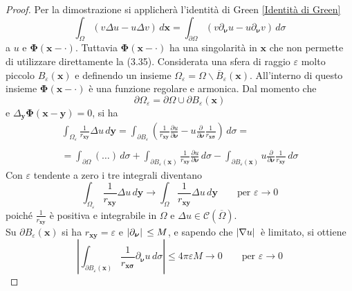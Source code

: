 \documentclass[a4paper,12pt, draft]{article}
\theoremstyle{break}
\let\epsilon\varepsilon
\numberwithin{equation}{section}
\begin{document}
\begin{proof}
  Per la dimostrazione si applicherà l'identità di Green \eqref{Identità di Green}
  \begin{equation}
    \int_{\Omega} (v\Delta u - u\Delta v) \, d\bm{x} = \int_{\partial \Omega} (v \partial_{\bm{\nu}}u - u\partial_{\bm{\nu}}v) \, d\sigma 
  \end{equation}
  a \(u\) e \(\bm{\Phi}(\bm{x}-\bm{\cdot})\). Tuttavia \(\bm{\Phi}(\bm{x}-\bm{\cdot})\) ha una singolarità in \(\bm{x}\) che non permette di utilizzare direttamente la (3.35). Considerata una sfera di raggio \(\epsilon\) molto piccolo \(B_{\epsilon}(\bm{x})\) e definendo un insieme \(\Omega_{\epsilon} = \Omega \backslash \overline{B}_{\epsilon}(\bm{x})\). All'interno di questo insieme \(\bm{\Phi}(\bm{x} - \bm{\cdot})\) è una funzione regolare e armonica. Dal momento che 
  \[
    \partial\Omega_{\epsilon} = \partial\Omega \cup \partial B_{\epsilon}(\bm{x})
  \]
  e \(\Delta_{\bm{y}}\bm{\Phi}(\bm{x} - \bm{y}) = 0\), si ha
  \begin{equation}
    \begin{array}{l}
      \int_{\Omega_{\epsilon}} \frac{1}{r_{\bm{xy}}} \Delta u \, d\bm{y} = \int_{\partial B_{\epsilon}} \left(\frac{1}{r_{\bm{xy}}} \frac{\partial u}{\partial \bm{\nu}} - u \frac{\partial}{\partial \bm{\nu}} \frac{1}{r_{\bm{x\sigma}}}\right) \, d\sigma = \\
      \\
    = \int_{\partial \Omega} (\ldots) \, d\sigma + \int_{\partial B_{\epsilon}(\bm{x})} \frac{1}{r_{\bm{xy}}} \frac{\partial u}{\partial \bm{\nu}} \, d\sigma - \int_{\partial B_{\epsilon}(\bm{x})} u\frac{\partial}{\partial \bm{\nu}} \frac{1}{r_{\bm{xy}}} \, d\sigma
    \end{array}
  \end{equation}
Con \(\epsilon\) tendente a zero i tre integrali diventano
\begin{equation}
  \int_{\Omega_{\epsilon}} \frac{1}{r_{\bm{xy}}} \Delta u \, d\bm{y} \to \int_{\Omega} \frac{1}{r_{\bm{xy}}} \Delta u \, d\bm{y} \qquad \mbox{per }\epsilon \to 0
\end{equation}
poiché \(\frac{1}{r_{\bm{xy}}}\) è positiva e integrabile in \(\Omega\) e \(\Delta u \in \mathcal{C}(\overline{\Omega})\). \\
Su \(\partial B_{\epsilon}(\bm{x})\) si ha \(r_{\bm{xy}} = \epsilon\) e \(\abs*{\partial_{\bm{\nu}}} \leq M\), e sapendo che \(\abs*{\nabla u}\) è limitato, si ottiene 
\begin{equation}
\left|\int_{\partial B_{\epsilon}(\bm{x})}\frac{1}{r_{\bm{x\sigma}}} \partial_{\bm{\nu}}u \, d\sigma\right| \leq 4\pi \epsilon M \to 0 \qquad \mbox{per } \epsilon \to 0

\end{equation}
\end{proof}
\end{document}
